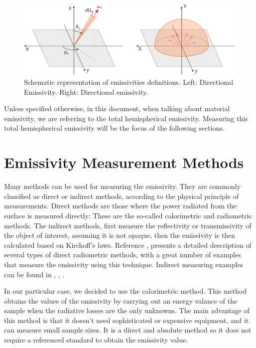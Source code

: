 \begin{figure}[h]
    \centering
    \includegraphics[width=1.0\columnwidth]{EmissivityDefinitions_Sch/EmissivityDeff.pdf}
    \caption{Schematic representation of emissivities definitions. Left: Directional Emissivity. Right: Directional emissivity.}
    \label{fig:MaxWavelenght}
\end{figure}

Unless specified otherwise, in this document, when talking about material emissivity, we are referring to the total hemispherical emissivity. Measuring this total hemispherical emissivity will be the focus of the following sections. 

\section{Emissivity Measurement Methods}

Many methods can be used for measuring the emissivity. They are commonly classified as direct or indirect methods, according to the physical principle of measurements. Direct methods are those where the power radiated from the surface is measured directly: These are the so-called calorimetric and radiometric methods. 
The indirect methods, first measure the reflectivity or transmissivity of the object of interest, assuming it is not opaque, then the emissivity is then calculated based on Kirchoff's laws. Reference \parencite[][]{ref:directMethods}, presents a detailed description of several types of direct radiometric methods, with a great number of examples that measure the emissivity using this technique. Indirect measuring examples can be found in \parencite[][]{ref:ind1}, \parencite[][]{ref:ind2}, \parencite[][]{ref:ind3}.

In our particular case, we decided to use the calorimetric method. This method obtains the values of the emissivity by carrying out an energy valance of the sample when the radiative losses are the only unknowns. The main advantage of this method is that it doesn't need sophisticated or expensive equipment, and it can measure small sample sizes. It is a direct and absolute method so it does not require a referenced standard to obtain the emissivity value. 

